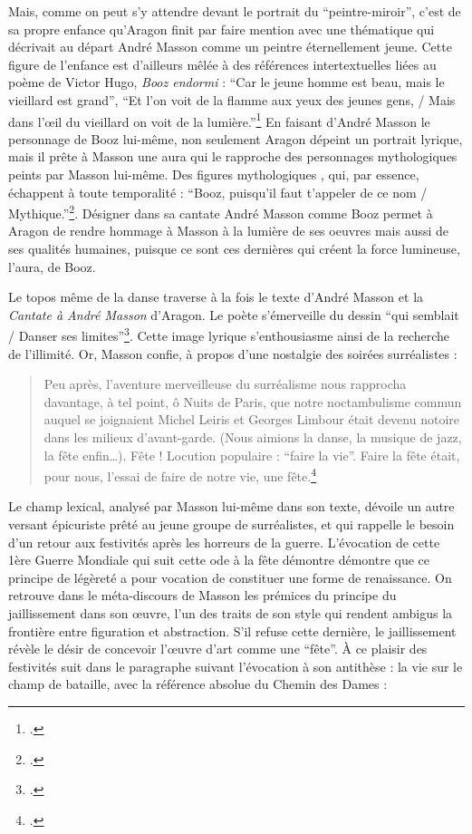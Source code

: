 	 Mais, comme on peut s’y attendre devant le portrait du \enquote{peintre-miroir}, c’est de sa propre enfance qu’Aragon finit par faire mention avec une thématique qui décrivait au départ André Masson comme un peintre éternellement jeune. Cette figure de l’enfance est d’ailleurs mêlée à des références intertextuelles liées au  poème de Victor Hugo, \emph{Booz endormi} : \enquote{Car le jeune homme est beau, mais le vieillard est grand}, \enquote{Et l'on voit de la flamme aux yeux des jeunes gens, / Mais dans l’\oe{}il du vieillard on voit de la lumière.}\footcite{hugo} En faisant d’André Masson le personnage de Booz lui-même, non seulement Aragon dépeint un portrait lyrique, mais il prête à Masson une aura qui le rapproche des personnages mythologiques peints par Masson lui-même. Des figures mythologiques , qui, par essence, échappent à toute temporalité : \enquote{Booz, puisqu'il faut t’appeler de ce nom / Mythique.}\footcite[p685]{ecritssurla}. Désigner dans sa cantate André Masson comme Booz permet à Aragon de rendre hommage à Masson à la lumière de ses oeuvres mais aussi de ses qualités humaines, puisque ce sont ces dernières qui créent la force lumineuse, l’aura, de Booz. 

	Le topos même de la danse traverse à la fois le texte d’André Masson et la \emph{Cantate à André Masson }d’Aragon. Le poète s'émerveille du dessin \enquote{qui semblait / Danser ses limites}\footcite[p682]{ecritssurla}. Cette image lyrique s'enthousiasme ainsi de la recherche de l'illimité. Or, Masson confie, à propos d’une nostalgie des soirées surréalistes : 
\begin{quote}
 Peu après, l’aventure merveilleuse du surréalisme nous rapprocha davantage, à tel point, ô Nuits de Paris, que notre noctambulisme commun auquel se joignaient Michel Leiris et Georges Limbour était devenu notoire dans les milieux d’avant-garde. (Nous aimions la danse, la musique de jazz, la fête enfin…). Fête ! Locution populaire : \enquote{faire la vie}. Faire la fête était, pour nous, l’essai de faire de notre vie, une fête.\footcite[p85]{rebelle}\end{quote}	

	Le champ lexical, analysé par Masson lui-même dans son texte, dévoile un autre versant épicuriste prêté au jeune groupe de surréalistes, et qui rappelle le besoin d’un retour aux festivités après les horreurs de la guerre. L’évocation de cette 1ère Guerre Mondiale qui suit cette ode à la fête démontre démontre que ce principe de légèreté a pour vocation de constituer une forme de renaissance. On retrouve dans le méta-discours de Masson les prémices du principe du jaillissement dans son \oe{}uvre, l’un des traits de son style qui rendent ambigus la frontière entre figuration et abstraction. S’il refuse cette dernière, le jaillissement révèle le désir de concevoir l’\oe{}uvre d’art comme une \enquote{fête}. À ce plaisir des festivités suit dans le paragraphe suivant l’évocation à son antithèse : la vie sur le champ de bataille, avec la référence absolue du Chemin des Dames : 


